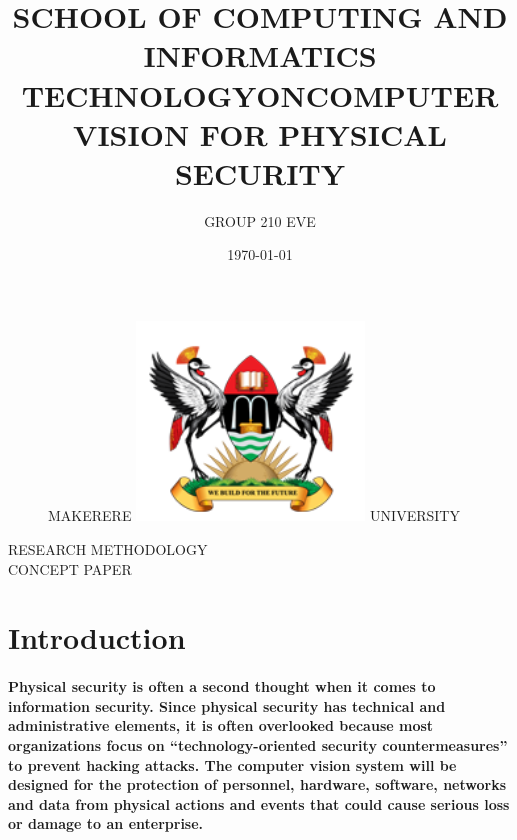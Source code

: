 \documentclass[11pt]{article}
\begin{document}
		
\title{SCHOOL OF COMPUTING AND INFORMATICS\\ TECHNOLOGY}
\author{GROUP 210 EVE}
\date{\today{}}
\begin{figure}
	\begin{center}
	\Huge MAKERERE \includegraphics[width=172pt]{muk.png} \Huge UNIVERSITY
	\end{center}
\end{figure}
	\maketitle
	
	\begin{center}
	RESEARCH METHODOLOGY \\CONCEPT PAPER
	\end{center}
\begin{center}
	\title{ON}
\end{center}
	\begin{center}
		\title{COMPUTER VISION FOR PHYSICAL SECURITY}
	\end{center}
    
	\newpage
	\section{ \textbf{Introduction} }
	 \paragraph{\textmd{Physical security is often a second thought when it comes to information security. Since physical security has technical and administrative elements, it is often overlooked because most organizations focus on “technology-oriented security countermeasures” \cite{DUMMY:2} to prevent hacking attacks. The computer vision system will be designed for the protection of personnel, hardware, software, networks and data from physical actions and events that could cause serious loss or damage to an enterprise.}}
	 
\end{document}
